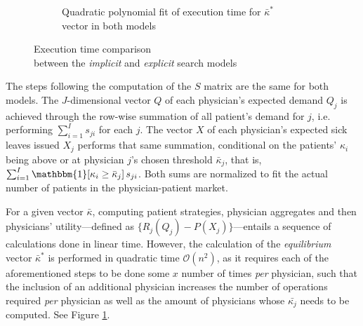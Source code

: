 \documentclass[../main.tex]{subfiles}
\begin{document}
\begin{figure}[H]
\begin{subfigure}[b]{0.45\linewidth}
        \vspace{-0.6cm}
        \caption{Quadratic polynomial fit of execution time for $\bar{\kappa}^*$  vector in both models}
        \label{fig:subfig2}
    \end{subfigure}
    \caption{Execution time comparison \\ between the \textit{implicit} and \textit{explicit} search models}
    \label{fig:comp1}
\end{figure}

The steps following the computation of the $S$ matrix are the same for both models. The $J$-dimensional vector $Q$ of each physician's expected demand $Q_j$ is achieved through the row-wise summation of all patient's demand for $j$, i.e. performing $\sum_{i=1}^{I} s_{ji}$ for each $j$. The vector $X$ of each physician's expected sick leaves issued $X_j$ performs that same summation, conditional on the patients' $\kappa_i$ being above or at physician $j$'s chosen threshold $\bar{\kappa}_j$, that is, $\sum_{i=1}^{I}  \mathbbm{1}[ \kappa_{i} \geq \bar{\kappa}_j] \, s_{ji}$. Both sums are normalized to fit the actual number of patients in the physician-patient market.

For a given vector $\bar{\kappa}$, computing patient strategies, physician aggregates and then physicians' utility—defined as $\{R_j(Q_j) - P(X_j)\}$—entails a sequence of calculations done in linear time. However, the calculation of the \textit{equilibrium} vector $\bar{\kappa}^*$ is performed in quadratic time $\mathcal{O}(n^2)$, as it requires each of the aforementioned steps to be done some $x$ number of times \textit{per} physician, such that the inclusion of an additional physician increases the number of operations required \textit{per} physician as well as the amount of physicians whose $\bar{\kappa_j}$ needs to be computed. See Figure \ref{fig:subfig2}.
\end{document}
